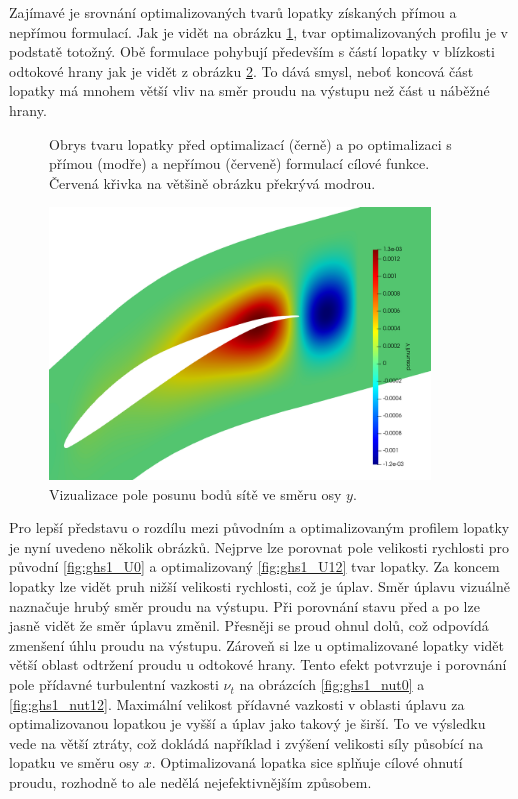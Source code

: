 Zajímavé je srovnání optimalizovaných tvarů lopatky získaných přímou a nepřímou formulací. Jak je vidět na obrázku \ref{fig:ghs1_alphaminus4}, tvar optimalizovaných profilu je v podstatě totožný. Obě formulace pohybují především s částí lopatky v blízkosti odtokové hrany jak je vidět z obrázku \ref{fig:ghs1_disp12}. To dává smysl, neboť koncová část lopatky má mnohem větší vliv na směr proudu na výstupu než část u náběžné hrany.

\begin{figure}
	\centering
	\def\svgwidth{1.0\textwidth}
	\graphicspath{{img/inkscape/}}
	
	\caption{Obrys tvaru lopatky před optimalizací (černě) a po optimalizaci s přímou (modře) a nepřímou (červeně) formulací cílové funkce. Červená křivka na většině obrázku překrývá modrou.}
	\label{fig:ghs1_alphaminus4}
\end{figure}
\begin{figure}
\includegraphics[width=0.9\textwidth]{img/displacement_12.png}
\caption{Vizualizace pole posunu bodů sítě ve směru osy $ y $.}
\label{fig:ghs1_disp12}
\end{figure}

Pro lepší představu o rozdílu mezi původním a optimalizovaným profilem lopatky je nyní uvedeno několik obrázků.
Nejprve lze porovnat pole velikosti rychlosti pro původní \ref{fig:ghs1_U0} a optimalizovaný \ref{fig:ghs1_U12} tvar lopatky. Za koncem lopatky lze vidět pruh nižší velikosti rychlosti, což je úplav. Směr úplavu vizuálně naznačuje hrubý směr proudu na výstupu. Při porovnání stavu před a po lze jasně vidět že směr úplavu změnil. Přesněji se proud ohnul dolů, což odpovídá zmenšení úhlu proudu na výstupu. Zároveň si lze u optimalizované lopatky vidět větší oblast odtržení proudu u odtokové hrany. Tento efekt potvrzuje i porovnání pole přídavné turbulentní vazkosti $ \nu_t $ na obrázcích \ref{fig:ghs1_nut0} a \ref{fig:ghs1_nut12}. Maximální velikost přídavné vazkosti v oblasti úplavu za optimalizovanou lopatkou je vyšší a úplav jako takový je širší. To ve výsledku vede na větší ztráty, což dokládá například i zvýšení velikosti síly působící na lopatku ve směru osy $ x $. Optimalizovaná lopatka sice splňuje cílové ohnutí proudu, rozhodně to ale nedělá nejefektivnějším způsobem.

